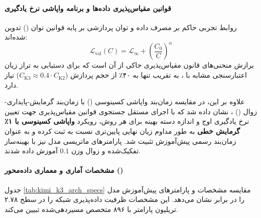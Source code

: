 \paragraph*{قوانین مقیاس‌پذیری داده‌ها و برنامه واپاشی نرخ یادگیری}
روابط تجربی حاکم بر مصرف داده و توان پردازشی بر پایه قوانین توان () تدوین شده‌اند:
\begin{equation}
    \mathcal{L}_{\text{val}}(C) = \mathcal{L}_{\infty} + \left(\frac{C_0}{C}\right)^{\alpha}
\end{equation}
برازش منحنی‌های قانون مقیاس‌پذیری حاکی از آن است که  برای دستیابی به تراز زیان اعتبارسنجی مشابه با ، به تقریب تنها به ۴۰٪ از حجم پردازش ($C_{\text{K3}} \approx 0.4 \cdot C_{\text{K2}}$) نیاز دارد. 

علاوه بر این، در مقایسه زمان‌بند واپاشی کسینوسی () با زمان‌بند گرمایش-پایداری-زوال () \cite{hu2024minicpm}، نشان داده شد که با اجرای مستقل جستجوی قوانین مقیاس‌پذیری جهت تعیین نرخ یادگیری اوج و اندازه دسته بهینه برای هر روش، رویکرد \textbf{واپاشی کسینوسی با ۱٪ گرمایش خطی} به طور مداوم زیان نهایی پایین‌تری نسبت به  ثبت کرده و به عنوان زمان‌بند رسمی پیش‌آموزش تثبیت شد. پارامترهای ماتریسی مدل نیز با بهینه‌ساز تفکیک‌شده  \cite{jordan2024muon} و زوال وزن $0.1$ آموزش داده شدند.

\paragraph*{مشخصات آماری و معماری داده‌محور ()}
جدول \ref{tab:kimi_k3_arch_specs} مقایسه مشخصات و پارامترهای پیش‌آموزش مدل  را در برابر  نشان می‌دهد. این مشخصات ظرفیت داده‌پذیری شبکه را در سطح ۲.۷۸ تریلیون پارامتر با ۸۹۶ متخصص مسیردهی‌شده تبیین می‌کند.

